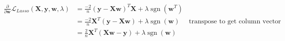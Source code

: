 \newcommand{\matrix}[1]{\mathbf{#1}}
\newcommand{\vector}[1]{\mathbf{#1}}
\newcommand{\X}{\matrix{X}}
\newcommand{\y}{\vector{y}}
\newcommand{\w}{\vector{w}}
\DeclareMathOperator{\sgn}{sgn}
\begin{align*}
\frac{\partial}{\partial \w} \mathcal{L}_{\textit{Lasso}} (\X,\y,\w,\lambda) &= \frac{-2}{n} (\y - \X\w)^T\X + \lambda \sgn(\w^T) \\
&= \frac{-2}{n} \X^T(\y - \X\w) + \lambda \sgn(\w) \quad \text{ transpose to get column vector} \\
&= \frac{2}{n} \X^T(\X\w - \y) + \lambda \sgn(\w) \\
\end{align*}
